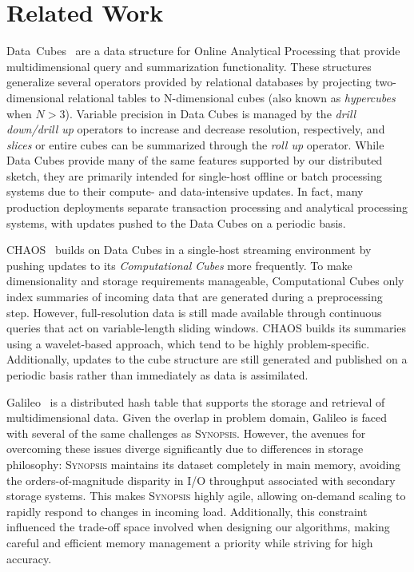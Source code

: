 \section{Related Work}
\label{sec:related}
Data~Cubes~\cite{gray1996data} are a data structure for Online Analytical Processing that provide multidimensional query and summarization functionality. These structures generalize several operators provided by relational databases by projecting two-dimensional relational tables to N-dimensional cubes (also known as \emph{hypercubes} when $N > 3$). Variable precision in Data Cubes is managed by the \emph{drill down/drill up} operators to increase and decrease resolution, respectively, and \emph{slices} or entire cubes can be summarized through the \emph{roll up} operator. While Data Cubes provide many of the same features supported by our distributed sketch, they are primarily intended for single-host offline or batch processing systems due to their compute- and data-intensive updates. In fact, many production deployments separate transaction processing and analytical processing systems, with updates pushed to the Data Cubes on a periodic basis. 

CHAOS~\cite{gupta2009chaos} builds on Data Cubes in a single-host streaming environment by pushing updates to its \emph{Computational Cubes} more frequently. To make dimensionality and storage requirements manageable, Computational Cubes only index summaries of incoming data that are generated during a preprocessing step. However, full-resolution data is still made available through continuous queries that act on variable-length sliding windows. CHAOS builds its summaries using a wavelet-based approach, which tend to be highly problem-specific. Additionally, updates to the cube structure are still generated and published on a periodic basis rather than immediately as data is assimilated.

Galileo~\cite{malensek2016analytic,malensek2015fast} is a distributed hash table that supports the storage and retrieval of multidimensional data. Given the overlap in problem domain, Galileo is faced with several of the same challenges as \textsc{Synopsis}. However, the avenues for overcoming these issues diverge significantly due to differences in storage philosophy: \textsc{Synopsis} maintains its dataset completely in main memory, avoiding the orders-of-magnitude disparity in I/O throughput associated with secondary storage systems. This makes \textsc{Synopsis} highly agile, allowing on-demand scaling to rapidly respond to changes in incoming load. Additionally, this constraint influenced the trade-off space involved when designing our algorithms, making careful and efficient memory management a priority while striving for high accuracy.

